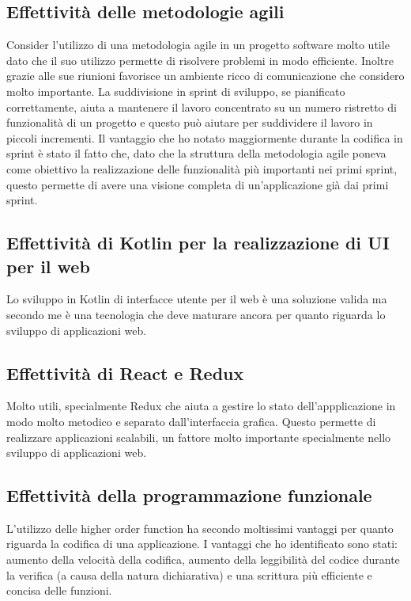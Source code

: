 \subsection{Effettività delle metodologie agili}
Consider l'utilizzo di una metodologia agile in un progetto software molto utile dato che il suo utilizzo permette di risolvere problemi in modo efficiente. Inoltre grazie alle sue riunioni favorisce un ambiente ricco di comunicazione che considero molto importante. La suddivisione in sprint di sviluppo, se pianificato correttamente, aiuta a mantenere il lavoro concentrato su un numero ristretto di funzionalità di un progetto e questo può aiutare per suddividere il lavoro in piccoli incrementi. Il vantaggio che ho notato maggiormente durante la codifica in sprint è stato il fatto che, dato che la struttura della metodologia agile poneva come obiettivo la realizzazione delle funzionalità più importanti nei primi sprint, questo permette di avere una visione completa di un'applicazione già dai primi sprint. 

\subsection{Effettività di Kotlin per la realizzazione di UI per il web}
Lo sviluppo in Kotlin di interfacce utente per il web è una soluzione valida ma secondo me è una tecnologia che deve maturare ancora per quanto riguarda lo sviluppo di applicazioni web.

\subsection{Effettività di React e Redux}
Molto utili, specialmente Redux che aiuta a gestire lo stato dell'appplicazione in modo molto metodico e separato dall'interfaccia grafica. Questo permette di realizzare applicazioni scalabili, un fattore molto importante specialmente nello sviluppo di applicazioni web.

\subsection{Effettività della programmazione funzionale}
L'utilizzo delle higher order function ha secondo moltissimi vantaggi per quanto riguarda la codifica di una applicazione. I vantaggi che ho identificato sono stati: aumento della velocità della codifica, aumento della leggibilità del codice durante la verifica (a causa della natura dichiarativa) e una scrittura più efficiente e concisa delle funzioni.
